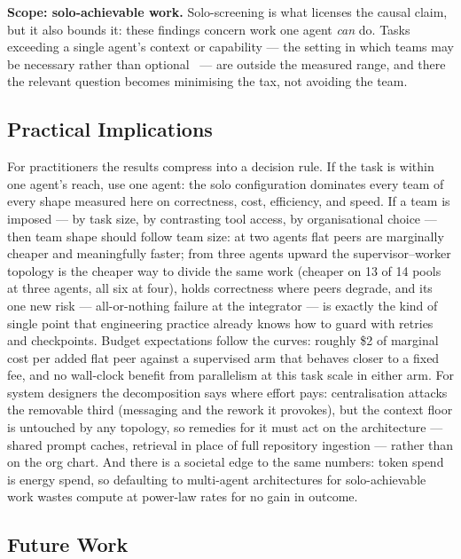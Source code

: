 \documentclass[11pt,a4paper]{article}
\begin{document}
\textbf{Scope: solo-achievable work.} Solo-screening is what licenses the causal claim, but it also bounds it: these findings concern work one agent \emph{can} do. Tasks exceeding a single agent's context or capability --- the setting in which teams may be necessary rather than optional~\cite{stone2010adhoc} --- are outside the measured range, and there the relevant question becomes minimising the tax, not avoiding the team.

\subsection{Practical Implications}\label{sec:implications}

For practitioners the results compress into a decision rule. If the task is within one agent's reach, use one agent: the solo configuration dominates every team of every shape measured here on correctness, cost, efficiency, and speed. If a team is imposed --- by task size, by contrasting tool access, by organisational choice --- then team shape should follow team size: at two agents flat peers are marginally cheaper and meaningfully faster; from three agents upward the supervisor--worker topology is the cheaper way to divide the same work (cheaper on 13 of 14 pools at three agents, all six at four), holds correctness where peers degrade, and its one new risk --- all-or-nothing failure at the integrator --- is exactly the kind of single point that engineering practice already knows how to guard with retries and checkpoints. Budget expectations follow the curves: roughly \$2 of marginal cost per added flat peer against a supervised arm that behaves closer to a fixed fee, and no wall-clock benefit from parallelism at this task scale in either arm. For system designers the decomposition says where effort pays: centralisation attacks the removable third (messaging and the rework it provokes), but the context floor is untouched by any topology, so remedies for it must act on the architecture --- shared prompt caches, retrieval in place of full repository ingestion --- rather than on the org chart. And there is a societal edge to the same numbers: token spend is energy spend, so defaulting to multi-agent architectures for solo-achievable work wastes compute at power-law rates for no gain in outcome.

\subsection{Future Work}\label{sec:futurework}
\end{document}
